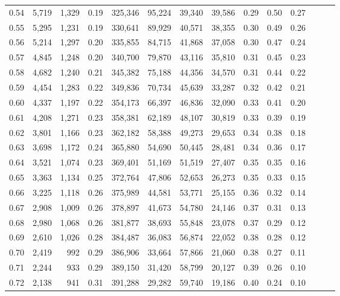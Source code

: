\begin{tabular}{rrrrrrrrrrrrrr}
0.54 &  5,719 &  1,329 &  0.19 &  325,346 &   95,224 &  39,340 &  39,586 &  0.29 &  0.50 &      0.27 \\
0.55 &  5,295 &  1,231 &  0.19 &  330,641 &   89,929 &  40,571 &  38,355 &  0.30 &  0.49 &      0.26 \\
0.56 &  5,214 &  1,297 &  0.20 &  335,855 &   84,715 &  41,868 &  37,058 &  0.30 &  0.47 &      0.24 \\
0.57 &  4,845 &  1,248 &  0.20 &  340,700 &   79,870 &  43,116 &  35,810 &  0.31 &  0.45 &      0.23 \\
0.58 &  4,682 &  1,240 &  0.21 &  345,382 &   75,188 &  44,356 &  34,570 &  0.31 &  0.44 &      0.22 \\
0.59 &  4,454 &  1,283 &  0.22 &  349,836 &   70,734 &  45,639 &  33,287 &  0.32 &  0.42 &      0.21 \\
0.60 &  4,337 &  1,197 &  0.22 &  354,173 &   66,397 &  46,836 &  32,090 &  0.33 &  0.41 &      0.20 \\
0.61 &  4,208 &  1,271 &  0.23 &  358,381 &   62,189 &  48,107 &  30,819 &  0.33 &  0.39 &      0.19 \\
0.62 &  3,801 &  1,166 &  0.23 &  362,182 &   58,388 &  49,273 &  29,653 &  0.34 &  0.38 &      0.18 \\
0.63 &  3,698 &  1,172 &  0.24 &  365,880 &   54,690 &  50,445 &  28,481 &  0.34 &  0.36 &      0.17 \\
0.64 &  3,521 &  1,074 &  0.23 &  369,401 &   51,169 &  51,519 &  27,407 &  0.35 &  0.35 &      0.16 \\
0.65 &  3,363 &  1,134 &  0.25 &  372,764 &   47,806 &  52,653 &  26,273 &  0.35 &  0.33 &      0.15 \\
0.66 &  3,225 &  1,118 &  0.26 &  375,989 &   44,581 &  53,771 &  25,155 &  0.36 &  0.32 &      0.14 \\
0.67 &  2,908 &  1,009 &  0.26 &  378,897 &   41,673 &  54,780 &  24,146 &  0.37 &  0.31 &      0.13 \\
0.68 &  2,980 &  1,068 &  0.26 &  381,877 &   38,693 &  55,848 &  23,078 &  0.37 &  0.29 &      0.12 \\
0.69 &  2,610 &  1,026 &  0.28 &  384,487 &   36,083 &  56,874 &  22,052 &  0.38 &  0.28 &      0.12 \\
0.70 &  2,419 &    992 &  0.29 &  386,906 &   33,664 &  57,866 &  21,060 &  0.38 &  0.27 &      0.11 \\
0.71 &  2,244 &    933 &  0.29 &  389,150 &   31,420 &  58,799 &  20,127 &  0.39 &  0.26 &      0.10 \\
0.72 &  2,138 &    941 &  0.31 &  391,288 &   29,282 &  59,740 &  19,186 &  0.40 &  0.24 &      0.10 \\

\end{tabular}
